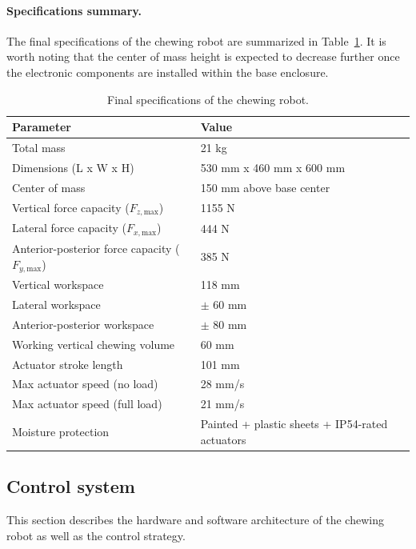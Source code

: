 \paragraph{Specifications summary.}The final specifications of the chewing robot are summarized in Table~\ref{tab:final_specs}. It is worth noting that 
the center of mass height is expected to decrease further once the electronic components are installed within the base enclosure.

\begin{table}[H]
\centering
\begin{tabular}{ l l }
\toprule
\textbf{Parameter} & \textbf{Value} \\
\midrule
Total mass & 21 kg \\
Dimensions (L x W x H) & 530 mm x 460 mm x 600 mm \\
Center of mass & 150 mm above base center \\
Vertical force capacity ($F_{z,\mathrm{max}}$) & 1155 N \\
Lateral force capacity ($F_{x,\mathrm{max}}$) & 444 N \\
Anterior-posterior force capacity ($F_{y,\mathrm{max}}$) & 385 N \\
Vertical workspace & 118 mm \\
Lateral workspace & $\pm$ 60 mm \\
Anterior-posterior workspace & $\pm$ 80 mm \\
Working vertical chewing volume & 60 mm \\
Actuator stroke length & 101 mm \\
Max actuator speed (no load) & 28 mm/s \\
Max actuator speed (full load) & 21 mm/s \\
Moisture protection & Painted + plastic sheets + IP54-rated actuators \\
\bottomrule
\end{tabular}
\caption{Final specifications of the chewing robot.}
\label{tab:final_specs}
\end{table}

\subsection{Control system}
\label{sec:control}

This section describes the hardware and software architecture of the chewing robot as well as the control strategy.



